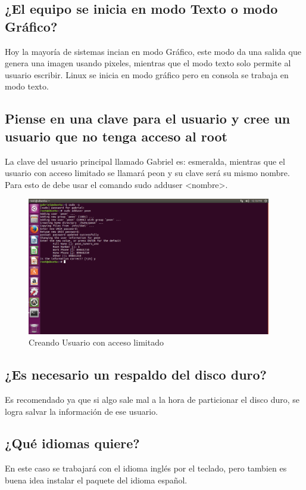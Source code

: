 \documentclass[
  letterpaper, 
  maincolor=black,
  sectioncolor=black!90,
  subsectioncolor=black!70,
  itemtextcolor=black!40,
]{fortysecondscv}
\begin{document}
\subsection{¿El equipo se inicia en modo Texto o modo Gráfico?}
    Hoy la mayoría de sistemas incian en modo Gráfico, este modo da una salida que genera una imagen usando pixeles, mientras que el modo texto solo permite al usuario escribir. Linux se inicia en modo gráfico pero en consola se trabaja en modo texto.
\subsection{Piense en una clave para el usuario y cree un usuario que no tenga acceso al root}
    La clave del usuario principal llamado Gabriel es: esmeralda, mientras que el usuario con acceso limitado se llamará peon y su clave será su mismo nombre. Para esto de debe usar el comando sudo adduser <nombre>.
    \begin{figure}[H]
        \centering
        \includegraphics[trim= 0 350 750 0,clip,width=0.95\textwidth]{img/CreandoUsuario.jpg}
        \caption{Creando Usuario con acceso limitado}
        \label{fig:my_label}
    \end{figure}
\subsection{¿Es necesario un respaldo del disco duro?}
    Es recomendado ya que si algo sale mal a la hora de particionar el disco duro, se logra salvar la información de ese usuario.
\subsection{¿Qué idiomas quiere?}
    En este caso se trabajará con el idioma inglés por el teclado, pero tambien es buena idea instalar el paquete del idioma español.
\end{document}
